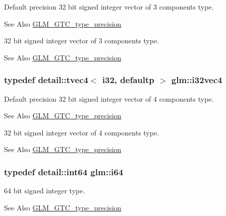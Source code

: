 Default precision 32 bit signed integer vector of 3 components type. \begin{DoxySeeAlso}{See Also}
\hyperlink{group__gtc__type__precision}{G\-L\-M\-\_\-\-G\-T\-C\-\_\-type\-\_\-precision}
\end{DoxySeeAlso}
32 bit signed integer vector of 3 components type. \begin{DoxySeeAlso}{See Also}
\hyperlink{group__gtc__type__precision}{G\-L\-M\-\_\-\-G\-T\-C\-\_\-type\-\_\-precision} 
\end{DoxySeeAlso}
\hypertarget{group__gtc__type__precision_ga5fea6ade2c848bca1fa55636e75a10b9}{
\subsubsection[{i32vec4}]{\setlength{\rightskip}{0pt plus 5cm}typedef detail\-::tvec4$<$ i32, defaultp $>$ {\bf glm\-::i32vec4}}}\label{group__gtc__type__precision_ga5fea6ade2c848bca1fa55636e75a10b9}
Default precision 32 bit signed integer vector of 4 components type. \begin{DoxySeeAlso}{See Also}
\hyperlink{group__gtc__type__precision}{G\-L\-M\-\_\-\-G\-T\-C\-\_\-type\-\_\-precision}
\end{DoxySeeAlso}
32 bit signed integer vector of 4 components type. \begin{DoxySeeAlso}{See Also}
\hyperlink{group__gtc__type__precision}{G\-L\-M\-\_\-\-G\-T\-C\-\_\-type\-\_\-precision} 
\end{DoxySeeAlso}
\hypertarget{group__gtc__type__precision_gac7a7eaad46064fc952b06df33689da23}{
\subsubsection[{i64}]{\setlength{\rightskip}{0pt plus 5cm}typedef detail\-::int64 {\bf glm\-::i64}}}\label{group__gtc__type__precision_gac7a7eaad46064fc952b06df33689da23}
64 bit signed integer type. \begin{DoxySeeAlso}{See Also}
\hyperlink{group__gtc__type__precision}{G\-L\-M\-\_\-\-G\-T\-C\-\_\-type\-\_\-precision} 
\end{DoxySeeAlso}
